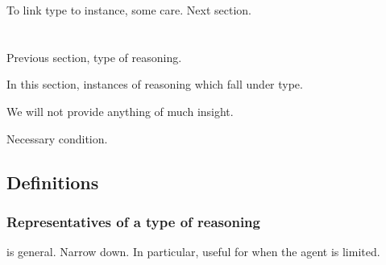 \begin{note}
  To link type to instance, some care.
  Next section.
\end{note}

\section{}
\label{cha:typical:sec:tR}

\begin{note}
  Previous section, type of reasoning.

  In this section, instances of reasoning which fall under type.

  We will not provide anything of much insight.

  Necessary condition.
\end{note}

\subsection{Definitions}
\label{cha:typical:sec:tR:defs}

\subsubsection{Representatives of a type of reasoning}
\label{sec:represntative}

\begin{note}
  \tor{} is general.
  Narrow down.
  In particular, useful for when the agent is limited.
\end{note}

